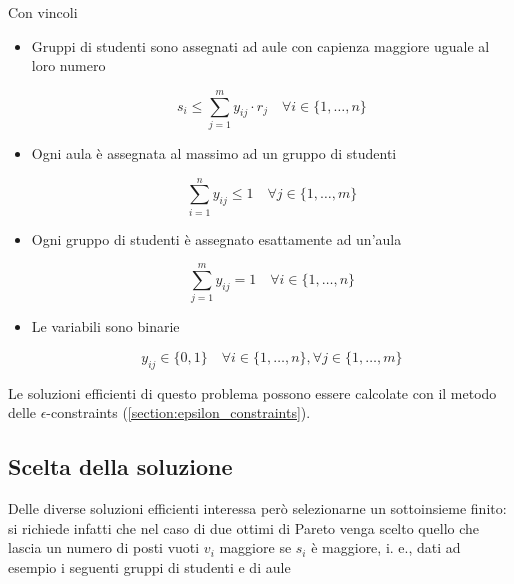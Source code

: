 Con vincoli

\begin{itemize}
    \item Gruppi di studenti sono assegnati ad aule con capienza maggiore uguale al loro numero

    \begin{equation}
        s_i \leq \sum_{j=1}^{m} y_{ij} \cdot r_j \quad \forall i \in \{1, \dots, n\}
        \label{eq:constraint_capacity}
    \end{equation}

    \item Ogni aula è assegnata al massimo ad un gruppo di studenti
    
    \begin{equation}
        \sum_{i=1}^{n} y_{ij} \leq 1 \quad \forall j \in \{1, \dots, m\}
        \label{eq:constraint_rooms}
    \end{equation}

    \item Ogni gruppo di studenti è assegnato esattamente ad un'aula
    
    \begin{equation}
        \sum_{j=1}^{m} y_{ij} = 1 \quad \forall i \in \{1, \dots, n\}
        \label{eq:constraint_students}
    \end{equation}
    
    \item Le variabili sono binarie
    
    \begin{equation}
        y_{ij} \in \{0,1\} \quad \forall i \in \{1,\dots, n\}, \forall j \in \{1, \dots, m\}
        \label{eq:_constraint_binary}
    \end{equation}
    
\end{itemize}

Le soluzioni efficienti di questo problema possono essere calcolate con il metodo delle 
$\epsilon$-constraints (\ref{section:epsilon_constraints}).

\subsection{Scelta della soluzione}
\label{section:sol_choice}

Delle diverse soluzioni efficienti interessa però selezionarne un sottoinsieme finito:
si richiede infatti che nel caso di due ottimi di Pareto venga scelto quello che lascia 
un numero di posti vuoti $v_i$ maggiore se $s_i$ è maggiore, i. e., dati ad esempio i seguenti gruppi di studenti e di aule

